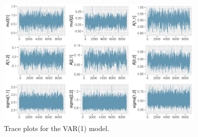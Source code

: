 \begin{figure}[H]
    \centering
    \includegraphics[width=0.9\textwidth]{images/6-VAR/traceplots.png}
    \caption{Trace plots for the VAR(1) model.}
\end{figure}
